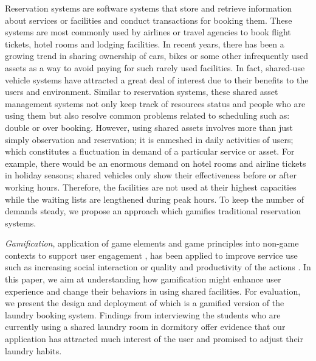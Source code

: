 Reservation systems are software systems that store and retrieve information about services or facilities and conduct transactions for booking them. %
These systems are most commonly used by airlines or travel agencies to book flight tickets, hotel rooms and lodging facilities. In recent years, there has been a growing trend in sharing ownership of cars, bikes or some other infrequently used assets as a way to avoid paying for such rarely used facilities. In fact, shared-use vehicle systems \cite{barth2002shared, nextbike} have attracted a great deal of interest due to their benefits to the users and environment. Similar to reservation systems, these shared asset management systems not only keep track of resources status and people who are using them but also resolve common problems related to scheduling such as: double or over booking. However, using shared assets involves more than just simply observation and reservation; it is enmeshed in daily activities of users; which constitutes a fluctuation in demand of a particular service or asset. For example, there would be an enormous demand on hotel rooms and airline tickets in holiday seasons; shared vehicles only show their effectiveness before or after working hours. Therefore, the facilities are not used at their highest capacities while the waiting lists are lengthened during peak hours. To keep the number of demands steady, we propose an approach which gamifies traditional reservation systems.

\emph{Gamification}, application of game elements and game principles into non-game contexts to support user engagement \cite{deterding2011game, hamari2014does}, has been applied to improve service use such as increasing social interaction or quality and productivity of the actions \cite{hamari2014does}. In this paper, we aim at understanding how gamification might enhance user experience and change their behaviors in using shared facilities. For evaluation, we present the design and deployment of {\toolname} which is a gamified version of the laundry booking system. Findings from interviewing the students who are currently using a shared laundry room in dormitory offer evidence that our application has attracted much interest of the user and promised to adjust their laundry habits.